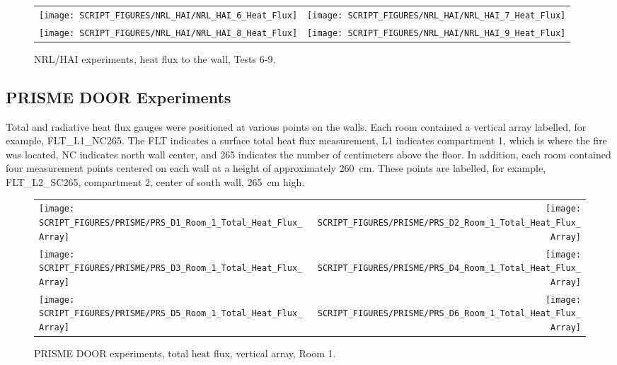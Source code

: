 \begin{figure}[p]
\begin{tabular*}{\textwidth}{l@{\extracolsep{\fill}}r}
\texttt{[image: SCRIPT\_FIGURES/NRL\_HAI/NRL\_HAI\_6\_Heat\_Flux]} &
\texttt{[image: SCRIPT\_FIGURES/NRL\_HAI/NRL\_HAI\_7\_Heat\_Flux]} \\
\texttt{[image: SCRIPT\_FIGURES/NRL\_HAI/NRL\_HAI\_8\_Heat\_Flux]} &
\texttt{[image: SCRIPT\_FIGURES/NRL\_HAI/NRL\_HAI\_9\_Heat\_Flux]}
\end{tabular*}
\label{NRL_HAI_2}
\caption{NRL/HAI experiments, heat flux to the wall, Tests 6-9.}
\end{figure}



\clearpage

\subsection{PRISME DOOR Experiments}

Total and radiative heat flux gauges were positioned at various points on the walls. Each room contained a vertical array labelled, for example, FLT\_L1\_NC265. The FLT indicates a surface total heat flux measurement, L1 indicates compartment 1, which is where the fire was located, NC indicates north wall center, and 265 indicates the number of centimeters above the floor. In addition, each room contained four measurement points centered on each wall at a height of approximately 260~cm. These points are labelled, for example, FLT\_L2\_SC265, compartment 2, center of south wall, 265~cm high.

\begin{figure}[!ht]
\begin{tabular*}{\textwidth}{l@{\extracolsep{\fill}}r}
\texttt{[image: SCRIPT\_FIGURES/PRISME/PRS\_D1\_Room\_1\_Total\_Heat\_Flux\_Array]} &
\texttt{[image: SCRIPT\_FIGURES/PRISME/PRS\_D2\_Room\_1\_Total\_Heat\_Flux\_Array]} \\
\texttt{[image: SCRIPT\_FIGURES/PRISME/PRS\_D3\_Room\_1\_Total\_Heat\_Flux\_Array]} &
\texttt{[image: SCRIPT\_FIGURES/PRISME/PRS\_D4\_Room\_1\_Total\_Heat\_Flux\_Array]} \\
\texttt{[image: SCRIPT\_FIGURES/PRISME/PRS\_D5\_Room\_1\_Total\_Heat\_Flux\_Array]} &
\texttt{[image: SCRIPT\_FIGURES/PRISME/PRS\_D6\_Room\_1\_Total\_Heat\_Flux\_Array]}
\end{tabular*}
\caption{PRISME DOOR experiments, total heat flux, vertical array, Room 1.}
\label{PRISME_Wall_Array_THF_Room_1}
\end{figure}


